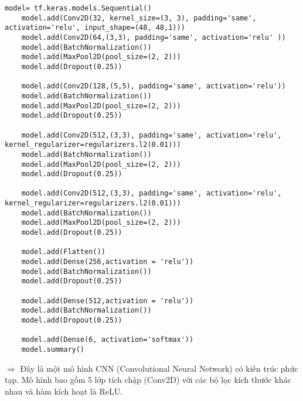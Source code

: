 \begin{lstlisting}[style=codePython]
	model= tf.keras.models.Sequential()
	model.add(Conv2D(32, kernel_size=(3, 3), padding='same', activation='relu', input_shape=(48, 48,1)))
	model.add(Conv2D(64,(3,3), padding='same', activation='relu' ))
	model.add(BatchNormalization())
	model.add(MaxPool2D(pool_size=(2, 2)))
	model.add(Dropout(0.25))
	
	model.add(Conv2D(128,(5,5), padding='same', activation='relu'))
	model.add(BatchNormalization())
	model.add(MaxPool2D(pool_size=(2, 2)))
	model.add(Dropout(0.25))
	
	model.add(Conv2D(512,(3,3), padding='same', activation='relu', kernel_regularizer=regularizers.l2(0.01)))
	model.add(BatchNormalization())
	model.add(MaxPool2D(pool_size=(2, 2)))
	model.add(Dropout(0.25))
	
	model.add(Conv2D(512,(3,3), padding='same', activation='relu', kernel_regularizer=regularizers.l2(0.01)))
	model.add(BatchNormalization())
	model.add(MaxPool2D(pool_size=(2, 2)))
	model.add(Dropout(0.25))
	
	model.add(Flatten()) 
	model.add(Dense(256,activation = 'relu'))
	model.add(BatchNormalization())
	model.add(Dropout(0.25))
	
	model.add(Dense(512,activation = 'relu'))
	model.add(BatchNormalization())
	model.add(Dropout(0.25))
	
	model.add(Dense(6, activation='softmax'))
	model.summary()					
\end{lstlisting}

$\Longrightarrow$ Đây là một mô hình CNN (Convolutional Neural Network) có kiến trúc phức tạp. Mô hình bao gồm 5 lớp tích chập (Conv2D) với các bộ lọc kích thước khác nhau và hàm kích hoạt là ReLU.

